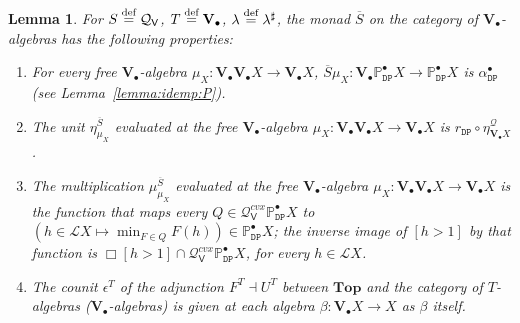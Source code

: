 \documentclass[preprint,12pt]{elsarticle}
\newcommand\eqdef{\mathrel{\buildrel \text{def}\over=}}
\newcommand\Lform{\mathcal L}
\newcommand\Pred{\mathbb{P}}
\newcommand\Demon{{\mathtt{D}}}
\newcommand\Nature{{\mathtt{P}}}
\newcommand\DN{{\Demon\Nature}}
\newcommand\Smyth{{\mathcal Q}}
\newcommand\Vt{\mathsf{V}}
\newcommand\SV{\Smyth_{\Vt}}
\newcommand\Val{{\mathbf V}}
\newcommand\Topcat{\mathbf{Top}}
\newtheorem{lemma}[theorem]{Lemma}
\begin{document}
\begin{lemma}
  \label{lemma:Sbar}
  For $S \eqdef \SV$, $T \eqdef \Val_\bullet$,
  $\lambda \eqdef \lambda^\sharp$, the monad $\overline S$ on the
  category of $\Val_\bullet$-algebras has the following properties:
  \begin{enumerate}
  \item For every free $\Val_\bullet$-algebra
    $\mu_X \colon \Val_\bullet {\Val_\bullet X} \to \Val_\bullet X$,
    $\overline S \mu_X \colon \Val_\bullet {\Pred_\DN^\bullet X} \to
    \Pred_\DN^\bullet X$ is $\alpha_\DN^\bullet$ (see
    Lemma~\ref{lemma:idemp:P}).
  \item The unit $\eta^{\overline S}_{\mu_X}$ evaluated at the free
    $\Val_\bullet$-algebra
    $\mu_X \colon \Val_\bullet {\Val_\bullet X} \to \Val_\bullet X$ is
    $r_\DN \circ \eta^\Smyth_{\Val_\bullet X}$.
  \item The multiplication $\mu^{\overline S}_{\mu_X}$ evaluated at
    the free $\Val_\bullet$-algebra
    $\mu_X \colon \Val_\bullet {\Val_\bullet X} \to \Val_\bullet X$ is
    the function that maps every $Q \in \SV^{cvx} {\Pred_\DN^\bullet
      X}$ to $(h \in \Lform X \mapsto \min_{F \in Q} F (h)) \in
    \Pred_\DN^\bullet X$; the inverse image of $[h > 1]$ by that
    function is $\Box {[h > 1]} \cap \SV^{cvx} {\Pred_\DN^\bullet X}$,
    for every $h \in \Lform X$.
  \item The counit $\epsilon^T$ of the adjunction $F^T \dashv U^T$
    between $\Topcat$ and the category of $T$-algebras
    ($\Val_\bullet$-algebras) is given at each algebra $\beta \colon
    \Val_\bullet X \to X$ as $\beta$ itself.
  \end{enumerate}
\end{lemma}
\end{document}
